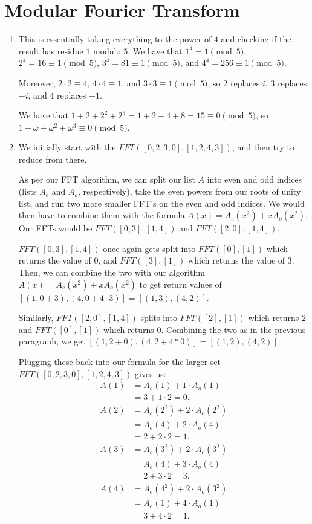 \documentclass{article}
\begin{document}
\newpage
\section{Modular Fourier Transform}
\begin{enumerate}[label = \alph*)]
	\item This is essentially taking everything to the power of $4$ and checking if the result has residue $1$ modulo $5$. We have that $1^4 = 1 \pmod 5$, $2^4 = 16 \equiv 1 \pmod 5$, $3^4 = 81 \equiv 1 \pmod 5$, and $4^4 = 256 \equiv 1 \pmod 5$. 
	
	Moreover, $2 \cdot 2 \equiv 4$, $4 \cdot 4 \equiv 1$, and $3 \cdot 3 \equiv 1 \pmod 5$, so $2$ replaces $i$, $3$ replaces $-i$, and $4$ replaces $-1$.
	
	We have that $1 + 2 + 2^2 + 2^3 = 1 + 2 + 4 + 8 = 15 \equiv 0 \pmod 5$, so $1 + \omega + \omega^2 + \omega^3 \equiv 0 \pmod 5$.  
	\item We initially start with the $FFT([0, 2, 3, 0], [1, 2, 4, 3])$, and then try to reduce from there.
	
	As per our FFT algorithm, we can split our list $A$ into even and odd indices (lists $A_e$ and $A_o$, respectively), take the even powers from our roots of unity list, and run two more smaller FFT's on the even and odd indices. We would then have to combine them with the formula $A(x) = A_e(x^2) + xA_o(x^2)$. Our FFTs would be $FFT([0, 3], [1, 4])$ and $FFT([2, 0], [1, 4])$. 
	
	$FFT([0, 3], [1, 4])$ once again gets split into $FFT([0], [1])$ which returns the value of $0$, and $FFT([3], [1])$ which returns the value of $3$. Then, we can combine the two with our algorithm $A(x) = A_e(x^2) + xA_o(x^2)$ to get return values of $[(1, 0 + 3), (4, 0 + 4 \cdot 3)] = [(1, 3), (4, 2)]$.
	
	Similarly, $FFT([2, 0], [1, 4])$ splits into $FFT([2], [1])$ which returns $2$ and $FFT([0], [1])$ which returns $0$. Combining the two as in the previous paragraph, we get $[(1, 2 + 0), (4, 2 + 4 * 0)] = [(1, 2), (4, 2)]$. 
	
	Plugging these back into our formula for the larger set $FFT([0, 2, 3, 0], [1, 2, 4, 3])$ gives us:
	\begin{align*}
		A(1) &= A_e(1) + 1 \cdot A_o(1) \\
		&= 3 + 1 \cdot 2 = \boxed{0}. \\
		A(2) &= A_e(2^2) + 2 \cdot A_o(2^2) \\
		&= A_e(4) + 2 \cdot A_o(4) \\
		&= 2 + 2 \cdot 2 = \boxed{1}. \\
		A(3) &= A_e(3^2) + 2 \cdot A_o(3^2) \\
		&= A_e(4) + 3 \cdot A_o(4) \\
		&= 2 + 3 \cdot 2 = \boxed{3}. \\
		A(4) &= A_e(4^2) + 2 \cdot A_o(3^2) \\
		&= A_e(1) + 4 \cdot A_o(1) \\
		&= 3 + 4 \cdot 2 = \boxed{1}.
	\end{align*}


\end{enumerate}
\end{document}
